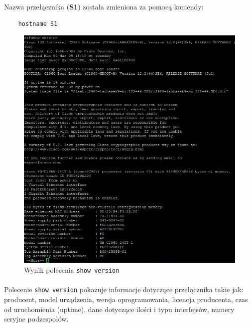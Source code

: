 \documentclass[wide,a4paper,titlepage,12pt] {article}
\begin{document}
  Nazwa przełącznika (\textbf{S1}) została zmieniona za pomocą komendy:
  \begin{verbatim}
    hostname S1
  \end{verbatim}


  \begin{figure}[htbp]
    \begin{center}
      \includegraphics[width=\textwidth]{img/t3.PNG}
      \caption{Wynik polecenia \texttt{show version}}
    \end{center}
  \end{figure}

  \paragraph{}
  Polecenie \texttt{show version} pokazuje informacje dotyczące przełącznika takie jak: producent, model urządzenia, wersja oprogramowania, licencja producenta, czas od uruchomienia (uptime), dane dotyczące ilości i typu interfejsów, numery seryjne podzespołów.
\end{document}
